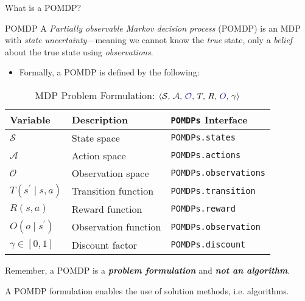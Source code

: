 
\begin{frame}[fragile]{What is a POMDP?}

\begin{definitionblock}{POMDP}
    A \textit{Partially observable Markov decision process} (POMDP) is an MDP with \textit{state uncertainty}---meaning we cannot know the \textit{true} state, only a \textit{belief} about the true state using \textit{observations}.
\end{definitionblock}

\phantom{}

\begin{itemize}
    \item Formally, a POMDP is defined by the following:
\end{itemize}
\begin{table}[!t]
    {\scriptsize
    \centering
    \caption{\label{tab:solutions} MDP Problem Formulation: $\langle \mathcal{S},\, \mathcal{A},\, {\color{darkblue}\mathcal{O}},\, T,\, R,\, {\color{darkblue}O},\, \gamma \rangle$}
    \begin{threeparttable}
    \begin{tabular}{lll}
        \toprule
        \textbf{Variable} & \textbf{Description} & \textbf{\texttt{POMDPs} Interface} \\
        \midrule
        $\mathcal{S}$ & State space & \texttt{POMDPs.states} \\
        $\mathcal{A}$ & Action space & \texttt{POMDPs.actions} \\
        $\mathcal{O}$ & Observation space & \texttt{POMDPs.observations} \\
        $T(s^\prime \mid s,a)$ & Transition function & \texttt{POMDPs.transition} \\
        $R(s,a)$ & Reward function & \texttt{POMDPs.reward} \\
        $O(o \mid s^\prime)$ & Observation function & \texttt{POMDPs.observation} \\
        $\gamma \in [0,1]$ & Discount factor & \texttt{POMDPs.discount} \\
        \bottomrule
    \end{tabular}
    \end{threeparttable}
    }
\end{table}

\begin{importantblock}
    {\footnotesize
    \begin{center}
    Remember, a POMDP is a \textit{\textbf{problem formulation}} and \textit{\textbf{not an algorithm}}.
  
    A POMDP formulation enables the use of solution methods, i.e. algorithms.
    \end{center}
    }
\end{importantblock}

\end{frame}

